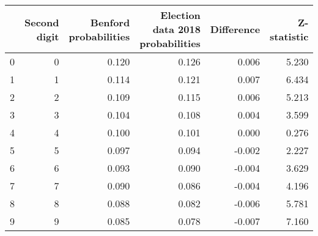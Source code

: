 \begin{tabular}{lrrrrr}
\toprule
 & Second digit & Benford probabilities & Election data 2018 probabilities & Difference & Z-statistic \\
\midrule
0 & 0 & 0.120 & 0.126 & 0.006 & 5.230 \\
1 & 1 & 0.114 & 0.121 & 0.007 & 6.434 \\
2 & 2 & 0.109 & 0.115 & 0.006 & 5.213 \\
3 & 3 & 0.104 & 0.108 & 0.004 & 3.599 \\
4 & 4 & 0.100 & 0.101 & 0.000 & 0.276 \\
5 & 5 & 0.097 & 0.094 & -0.002 & 2.227 \\
6 & 6 & 0.093 & 0.090 & -0.004 & 3.629 \\
7 & 7 & 0.090 & 0.086 & -0.004 & 4.196 \\
8 & 8 & 0.088 & 0.082 & -0.006 & 5.781 \\
9 & 9 & 0.085 & 0.078 & -0.007 & 7.160 \\
\bottomrule
\end{tabular}
